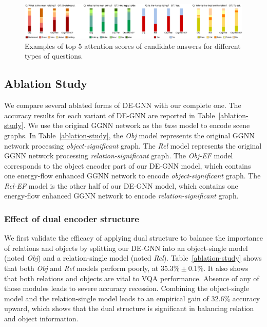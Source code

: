 \documentclass[letterpaper]{article} %
\begin{document}
\begin{figure}[ht] 
    \centering 
    \includegraphics[width=1\textwidth]{./pic/visual_detail.pdf} 
    \caption{Examples of top 5 attention scores of candidate answers for different types of questions.} 
    \label{visualbis} 
\end{figure}


\subsection{Ablation Study}
We compare several ablated forms of DE-GNN with our complete one. 
The accuracy results for each variant of DE-GNN are reported in Table~\ref{ablation-study}. 
We use the original GGNN network as the \emph{base} model to encode scene graphs.
In Table~\ref{ablation-study}, the \emph{Obj} model represents the original GGNN network processing \emph{object-significant} graph. The \emph{Rel} model represents the original GGNN network processing \emph{relation-significant} graph.
The \emph{Obj-EF} model corresponds to the object encoder part of our DE-GNN model, which contains one energy-flow enhanced GGNN network to encode \emph{object-significant} graph. 
The \emph{Rel-EF} model is the other half of our DE-GNN model, which contains one energy-flow enhanced GGNN network to encode \emph{relation-significant} graph.

\subsubsection{Effect of dual encoder structure} We first validate the efficacy of applying dual structure to balance the importance of relations and objects by splitting our DE-GNN into an object-single model (noted \emph{Obj}) and a relation-single model (noted \emph{Rel}). Table~\ref{ablation-study} shows that both \emph{Obj} and \emph{Rel} models perform poorly, at $35.3\%\pm0.1\%$. 
It also shows that both relations and objects are vital to VQA performance. 
Absence of any of those modules leads to severe accuracy recession. 
Combining the object-single model and the relation-single model leads to an empirical gain of 32.6\% accuracy upward, which shows that the dual structure is significant in balancing relation and object information. 
\end{document}
